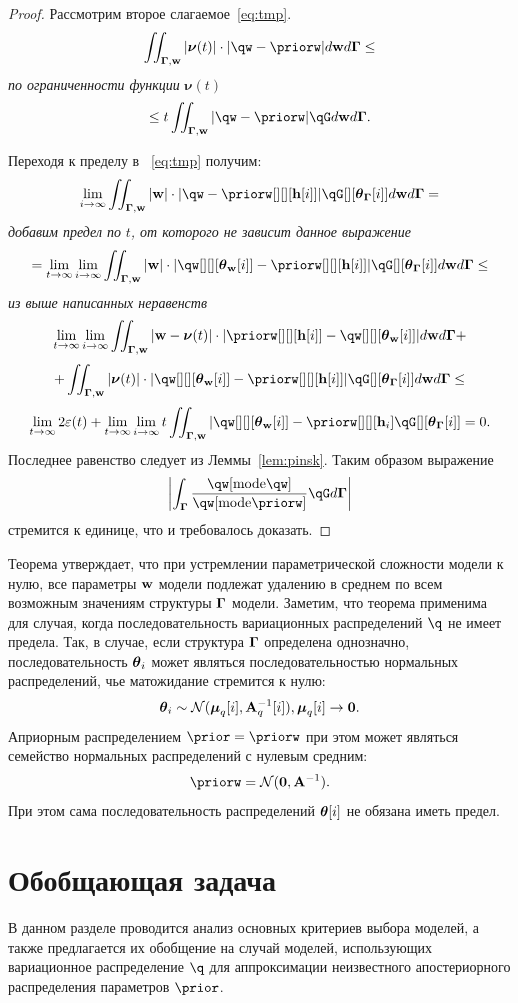 \begin{proof}
Рассмотрим второе слагаемое~\eqref{eq:tmp}.
$$
\iint_{\G,\w} |\boldsymbol{\nu}(t)|\cdot |\qw - \priorw| d\w d\G \leq 
$$
\textit{по ограниченности функции }$\boldsymbol{\nu}(t)$
$$
  \leq  t \iint_{\G,\w}  |\qw - \priorw|\qG d\w d\G.
$$

Переходя к пределу в ~\eqref{eq:tmp} получим:
$$
    \lim_{i \to \infty} \iint_{\G,\w} |\w| \cdot |\qw - \priorw[][][{\h[i]}]|\qG[][{\tetaG[i]}] d\w d\G  =
$$
\textit{добавим предел по }$t$\textit{, от которого не зависит данное выражение}
$$
= \lim_{t \to \infty}\lim_{i \to \infty}\iint_{\G,\w} |\w|\cdot |\qw[][][{\tetaw[i]}] - \priorw[][][{\h[i]}]|\qG[][{\tetaG[i]}] d\w d\G \leq
$$
\textit{из выше написанных неравенств}
$$
    \lim_{t \to \infty}\lim_{i \to \infty} \iint_{\G,\w} |\w -\boldsymbol{\nu}(t)|\cdot|\priorw[][][{\h[i]}] -\qw[][][{\tetaw[i]}]| d\w d\G   +
$$
$$
 + \iint_{\G,\w} |\boldsymbol{\nu}(t)| \cdot |\qw[][][{\tetaw[i]}] - \priorw[][][{\h[i]}]|\qG[][{\tetaG[i]}] d\w d\G \leq
$$
$$
     \lim_{t \to \infty}  2\varepsilon(t)  + \lim_{t \to \infty}\lim_{i \to \infty}  t \iint_{\G,\w}  |\qw[][][{\tetaw[i]}] - \priorw[][][\h_i]\qG[][{\tetaG[i]}] = 0.
$$
Последнее равенство следует из Леммы~\ref{lem:pinsk}.
Таким образом выражение $$\left|\int_{\G} \frac{\qw[\text{mode}\qw]}{\qw[\text{mode}\priorw]}\qG d\G \right|$$ стремится к единице, что и требовалось доказать.
\end{proof}

Теорема утверждает, что при устремлении параметрической сложности модели к нулю, все параметры $\mathbf{w}$  модели подлежат удалению в среднем по всем возможным значениям  структуры $\boldsymbol{\Gamma}$ модели. Заметим, что теорема применима для случая, когда последовательность вариационных распределений $\q$ не имеет предела. Так, в случае, если структура $\boldsymbol{\Gamma}$ определена однозначно, последовательность $\boldsymbol{\theta}_i$ может являться последовательностью нормальных распределений, чье матожидание стремится к нулю:
\[
    \boldsymbol{\theta}_i \sim \mathcal{N}(\boldsymbol{\mu}_q[i], \mathbf{A}^{-1}_q[i]), \boldsymbol{\mu}_q[i] \to \mathbf{0}.
\]
Априорным распределением $\prior = \priorw$ при этом может являться семейство нормальных распределений с нулевым средним:
\[
    \priorw = \mathcal{N}(\mathbf{0}, \A^{-1}).
\]
При этом сама последовательность распределений $\boldsymbol{\theta}[i]$ не обязана иметь предел.

\section{Обобщающая задача}
В данном разделе проводится анализ основных критериев выбора моделей, а также предлагается их обобщение на случай моделей, использующих вариационное распределение $\q$ для аппроксимации неизвестного апостериорного распределения параметров $\prior$.

